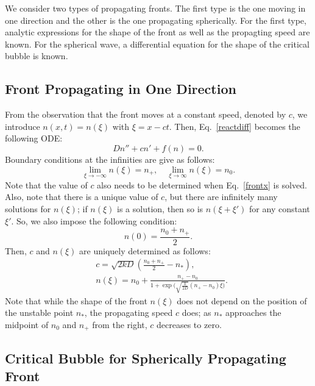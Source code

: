 \documentclass{article}
\begin{document}
We consider two types of propagating fronts.
The first type is the one moving in one direction and the other is the one propagating spherically.
For the first type, analytic expressions for the shape of the front as well as the propagting speed are known.
For the spherical wave, a differential equation for the shape of the critical bubble is known.

\subsection{Front Propagating in One Direction}

From the observation that the front moves at a constant speed, denoted by $c$, we introduce $n(x,t)=n(\xi)$ with $\xi=x-ct$.
Then, Eq.~\eqref{reactdiff} becomes the following ODE:
\begin{equation}
\label{frontx}
Dn''+cn'+f(n)=0.
\end{equation}
Boundary conditions at the infinities are give as follows:
\begin{equation}
\label{bc_frontx}
\lim_{\xi\rightarrow -\infty}n(\xi)=n_+,\quad
\lim_{\xi\rightarrow \infty}n(\xi)=n_0.
\end{equation}
Note that the value of $c$ also needs to be determined when Eq.~\eqref{frontx} is solved.
Also, note that there is a unique value of $c$, but there are infinitely many solutions for $n(\xi)$; if $n(\xi)$ is a solution, then so is $n(\xi+\xi')$ for any constant $\xi'$.
So, we also impose the following condition:
\begin{equation}
n(0)=\frac{n_0+n_+}{2}.
\end{equation}
Then, $c$ and $n(\xi)$ are uniquely determined as follows:
\begin{align}
\label{cprop}
& c = \sqrt{2kD}\left(\frac{n_0+n_+}{2}-n_*\right),\\
\label{nxi}
& n(\xi)=n_0+\frac{n_+-n_0}{1+\exp\Big(\sqrt{\frac{k}{2D}}(n_+-n_0)\xi\Big)}.
\end{align}
Note that while the shape of the front $n(\xi)$ does not depend on the position of the unstable point $n_*$, the propagating speed $c$ does; as $n_*$ approaches the midpoint of $n_0$ and $n_+$ from the right, $c$ decreases to zero.

\subsection{Critical Bubble for Spherically Propagating Front}
\end{document}
